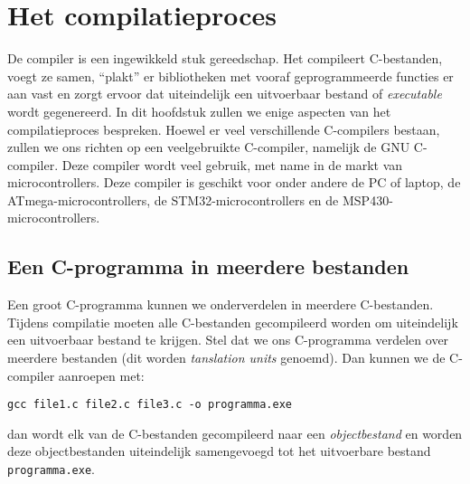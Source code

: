 \chapter{Het compilatieproces}
\label{cha:compilatieproces}
\thispagestyle{empty}

De compiler is een ingewikkeld stuk gereedschap. Het compileert C-bestanden, voegt ze samen, ``plakt'' er bibliotheken met vooraf geprogrammeerde functies er aan vast en zorgt ervoor dat uiteindelijk een uitvoerbaar bestand of \textsl{executable} wordt gegenereerd. In dit hoofdstuk zullen we enige aspecten van het compilatieproces bespreken. Hoewel er veel verschillende C-compilers bestaan, zullen we ons richten op een veelgebruikte C-compiler, namelijk de GNU C-compiler. Deze compiler wordt veel gebruik, met name in de markt van microcontrollers. Deze compiler is geschikt voor onder andere de PC of laptop, de ATmega-microcontrollers, de STM32-microcontrollers en de MSP430-microcontrollers.



\section{Een C-programma in meerdere bestanden}
Een groot C-programma kunnen we onderverdelen in meerdere C-bestanden. Tijdens compilatie moeten alle C-bestanden gecompileerd worden om uiteindelijk een uitvoerbaar bestand te krijgen. Stel dat we ons C-programma verdelen over meerdere bestanden (dit worden \textsl{tanslation units} genoemd). Dan kunnen we de C-compiler aanroepen met:

\hspace*{1em}\texttt{gcc file1.c file2.c file3.c -o programma.exe}

dan wordt elk van de C-bestanden gecompileerd naar een \textsl{objectbestand} en worden deze objectbestanden uiteindelijk samengevoegd tot het uitvoerbare bestand \texttt{programma.exe}.



